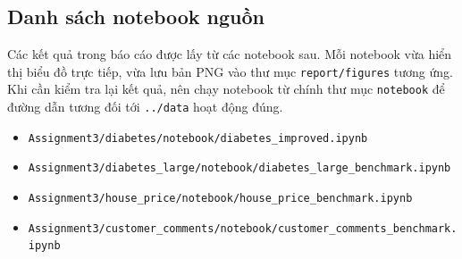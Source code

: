 \documentclass[12pt,a4paper]{report}
\newcommand{\modelpath}[1]{\texttt{#1}}
\begin{document}
\begin{table}[H]
\centering
\caption{Checklist tái lập thực nghiệm}
\label{tab:reproducibility_checklist}
\end{table}

\subsection{Danh sách notebook nguồn}
Các kết quả trong báo cáo được lấy từ các notebook sau.
Mỗi notebook vừa hiển thị biểu đồ trực tiếp, vừa lưu bản PNG vào thư mục \modelpath{report/figures} tương ứng.
Khi cần kiểm tra lại kết quả, nên chạy notebook từ chính thư mục \modelpath{notebook} để đường dẫn tương đối tới \modelpath{../data} hoạt động đúng.

\begin{itemize}
    \item \modelpath{Assignment3/diabetes/notebook/diabetes\_improved.ipynb}
    \item \modelpath{Assignment3/diabetes\_large/notebook/diabetes\_large\_benchmark.ipynb}
    \item \modelpath{Assignment3/house\_price/notebook/house\_price\_benchmark.ipynb}
    \item \modelpath{Assignment3/customer\_comments/notebook/customer\_comments\_benchmark.ipynb}
\end{itemize}
\end{document}
